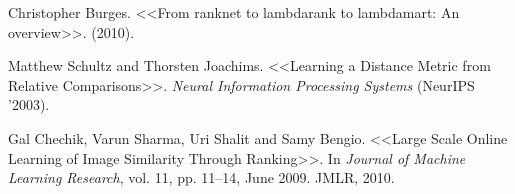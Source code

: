 \begin{thebibliography}{1}
 Christopher Burges. <<From ranknet to lambdarank to lambdamart: An overview>>. (2010).

 Matthew Schultz and Thorsten Joachims. <<Learning a Distance Metric from Relative Comparisons>>. \textit{Neural Information Processing Systems} (NeurIPS '2003).

 Gal Chechik, Varun Sharma, Uri Shalit and Samy Bengio. <<Large Scale Online Learning of Image Similarity Through Ranking>>. In \textit{Journal of Machine Learning Research}, vol. 11, pp. 11--14, June 2009. JMLR, 2010.


\end{thebibliography}
